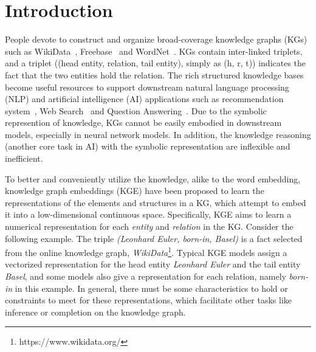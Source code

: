 \documentclass[twocolumn,a4paper,preprint,10pt,3p]{elsarticle}
\begin{document}

\linenumbers{}


\section{Introduction}
\label{sec:intro}

People devote to construct and organize broad-coverage knowledge graphs (KGs) such as WikiData~\cite{wikidata}, Freebase~\cite{freebase} and WordNet~\cite{miller1995wordnet}. KGs contain inter-linked triplets, and a triplet ((head entity, relation, tail entity), simply as (h, r, t)) indicates the fact that the two entities hold the relation. The rich structured knowledge bases become useful resources to support downstream natural language processing (NLP) and artificial intelligence (AI) applications such as recommendation system~\cite{Zhang2016recommendation}, Web Search~\cite{Su2015websearch,Yahya2016websearch} and Question Answering~\cite{yih2015semantic}. Due to the symbolic represention of knowledge, KGs cannot be easily embodied in downstream models, especially in neural network models. In addition, the knowledge reasoning (another core task in AI) with the symbolic representation are inflexible and inefficient.

To better and conveniently utilize the knowledge, alike to the word embedding, knowledge graph embeddings (KGE) have been proposed to learn the representations of the elements and structures in a KG, which attempt to embed it into a low-dimensional continuous space.  Specifically, KGE aims to learn a numerical  representation for each \emph{entity} and \emph{relation} in the KG. Consider the following example. The triple \emph{(Leonhard Euler, born-in, Basel)} is a fact selected from the online knowledge graph, \emph{WikiData}\footnote{https://www.wikidata.org/}. Typical KGE models assign a vectorized representation for the head entity \emph{Leonhard Euler} and the tail entity \emph{Basel}, and some models also give a representation for each relation, namely \emph{born-in} in this example. In general, there must be some characteristics to hold or constraints to meet for these representations, which facilitate other tasks like inference or completion on the knowledge graph.
\end{document}
